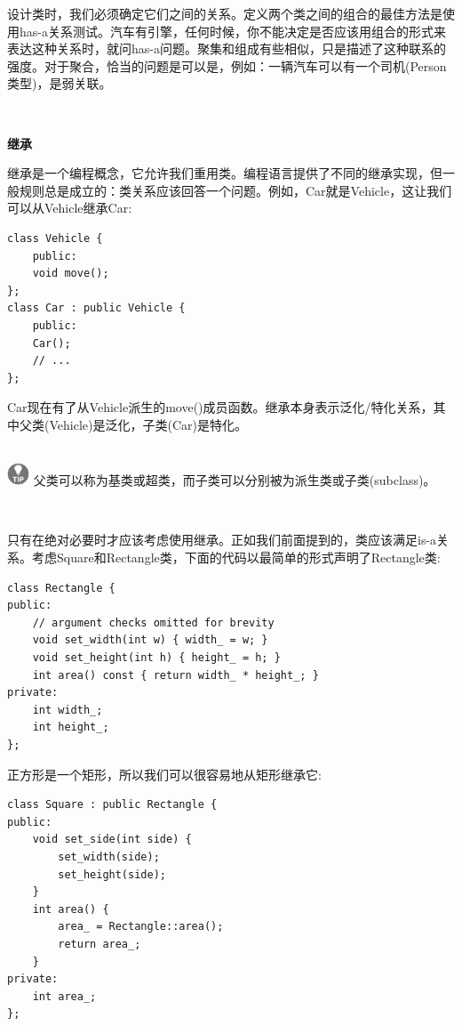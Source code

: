 设计类时，我们必须确定它们之间的关系。定义两个类之间的组合的最佳方法是使用has-a关系测试。汽车有引擎，任何时候，你不能决定是否应该用组合的形式来表达这种关系时，就问has-a问题。聚集和组成有些相似，只是描述了这种联系的强度。对于聚合，恰当的问题是可以是，例如：一辆汽车可以有一个司机(Person类型)，是弱关联。 \par

\noindent\textbf{}\ \par
\textbf{继承} \ \par
继承是一个编程概念，它允许我们重用类。编程语言提供了不同的继承实现，但一般规则总是成立的：类关系应该回答一个问题。例如，Car就是Vehicle，这让我们可以从Vehicle继承Car: \par

\begin{lstlisting}[caption={}]
class Vehicle {
	public:
	void move();
};
class Car : public Vehicle {
	public:
	Car();
	// ...
};
\end{lstlisting}

Car现在有了从Vehicle派生的move()成员函数。继承本身表示泛化/特化关系，其中父类(Vehicle)是泛化，子类(Car)是特化。 \par

\hspace*{\fill} \\ %
\includegraphics[width=0.05\textwidth]{images/tip}
父类可以称为基类或超类，而子类可以分别被为派生类或子类(subclass)。 \par
\noindent\textbf{}\ \par

只有在绝对必要时才应该考虑使用继承。正如我们前面提到的，类应该满足is-a关系。考虑Square和Rectangle类，下面的代码以最简单的形式声明了Rectangle类: \par

\begin{lstlisting}[caption={}]
class Rectangle {
public:
	// argument checks omitted for brevity
	void set_width(int w) { width_ = w; }
	void set_height(int h) { height_ = h; }
	int area() const { return width_ * height_; }
private:
	int width_;
	int height_;
};
\end{lstlisting}

正方形是一个矩形，所以我们可以很容易地从矩形继承它: \par

\begin{lstlisting}[caption={}]
class Square : public Rectangle {
public:
	void set_side(int side) {
		set_width(side);
		set_height(side);
	}
	int area() {
		area_ = Rectangle::area();
		return area_;
	}
private:
	int area_;
};
\end{lstlisting}

